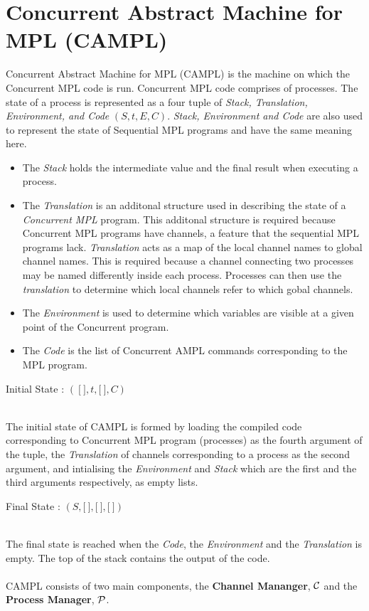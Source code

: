 \documentclass[11pt]{article}
\newcommand{\<}{\langle}
\renewcommand{\>}{\rangle}
\begin{document}
\section {Concurrent Abstract Machine for MPL (CAMPL)}
Concurrent Abstract Machine for MPL (CAMPL) is the machine on which the Concurrent MPL code is run. Concurrent MPL code comprises of processes. The state of a process is represented as a four tuple of {\em Stack, Translation, Environment, and Code} $(S,t,E,C)$. {\em Stack, Environment and Code} are also used to represent the state of Sequential MPL programs and have the same meaning here. 
\begin{itemize}
  \item The {\em Stack} holds the intermediate value and the final result when executing a process.
  \item The {\em Translation} is an additonal structure used in describing the state of a {\em Concurrent MPL} program. This additonal structure is required because Concurrent MPL programs have channels, a feature that the sequential MPL programs lack. {\em Translation} acts as a map of the local channel names to global channel names. This is required because a channel connecting two processes may be named differently inside each process. Processes can then use the {\em translation} to determine which local channels refer to which gobal channels.

  \item The {\em Environment} is used to determine which variables are visible at a given point of the Concurrent program.
  \item The {\em Code} is the list of Concurrent AMPL commands corresponding to the MPL program.
\end{itemize}

\begin{center}
Initial State : $(~\lbrack~\rbrack,t,\lbrack~\rbrack,C)$
\end{center}
~~\\
The initial state of CAMPL is formed by loading the compiled code corresponding to Concurrent MPL program (processes) as the fourth argument of the tuple, the {\em Translation} of channels corresponding to a process as the second argument, and intialising the {\em Environment} and {\em Stack} which are the first and the third arguments respectively, as empty lists.
~~\\
\begin{center}
Final State : $(S,\lbrack~\rbrack,\lbrack~\rbrack,\lbrack~\rbrack)$
\end{center}
~~\\
The final state is reached when the {\em Code}, the {\em Environment} and the {\em Translation} is empty. The top of the stack contains the output of the code.
~~\\~~\\
CAMPL consists of two main components, the {\bf Channel Mananger}, $\cal C$ and the {\bf Process Manager}, $\cal P$.
\end{document}
